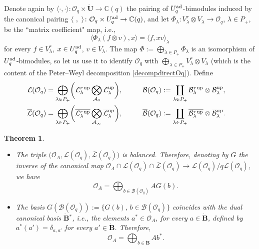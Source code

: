 \documentclass[pdftex]{sigma}
\numberwithin{equation}{section}
\newtheorem{teo}{Theorem}[section]
\theoremstyle{definition}
\newcommand{\Oq}{\Oo_{q}}
\newcommand{\mc}{\mathbb{C}}
\newcommand{\Ll}{{\mathcal L}}
\newcommand{\Oo}{{\mathcal O}}
\newcommand{\ra}{\rightarrow}
\begin{document}
Denote again by $\langle\cdot,\cdot \rangle \colon \Oq \times \dot{\mathbf{U}} \ra \mc(q)$ the pairing of $U_q^{\rm ad}$-bimodules induced by the canonical pairing $\langle\ ,\ \rangle \colon \Oq \times U_q^{\rm ad} \ra \mc(q)$, and let $\Phi_\lambda\colon V_\lambda^r \otimes V_\lambda \ra \Oo_q$, $\lambda\in P_+$, be the ``matrix coefficient" map, i.e.,
\begin{equation}\label{pairingOAKashi}
\langle \Phi_\lambda (f \otimes v),x\rangle = \langle f, xv\rangle_\lambda
\end{equation}
for every $f\in V_\lambda^r$, $x\in U_q^{\rm ad}$, $v\in V_\lambda$. The map $\Phi := \bigoplus_{\lambda\in P_+} \Phi_\lambda$ is an isomorphism of $U_q^{\rm ad}$-bimodules, so let us use it to identify $\Oo_q$ with $\bigoplus_{\lambda\in P_+} V_\lambda^r \otimes V_\lambda$ (which is the content of the Peter--Weyl decomposition \eqref{decompdirectOq}). Define
\begin{alignat*}{3}
& \Ll(\Oo_q) = \bigoplus_{\lambda\in P_+} \biggl(\Ll_{\lambda}^r {}^{\rm up} \bigotimes_{\mathcal{A}_0} \Ll_{\lambda}^{\rm up}\biggr),\qquad && \mathcal{B}(\Oo_q) := \coprod_{\lambda\in P_+} \mathcal{B}_\lambda^r {}^{\rm up} \otimes \mathcal{B}_\lambda^{\rm up},& \\
& \overline{\Ll}(\Oo_q) = \bigoplus_{\lambda\in P_+} \biggl(\overline{\Ll_{\lambda}^r {}^{\rm up}} \bigotimes_{\mathcal{A}_\infty} \overline{\Ll_{\lambda}^{\rm up}}\biggr),\qquad && \overline{\mathcal{B}}(\Oo_q) := \coprod_{\lambda\in P_+} \overline{\mathcal{B}_\lambda^r {}^{\rm up}} \otimes \overline{\mathcal{B}_\lambda^{\rm up}}.&
\end{alignat*}
\begin{teo}\label{canKashi} \quad
\begin{itemize}\itemsep=0pt
\item[$(i)$] The triple $\big(\Oo_A,\Ll(\Oo_q),\overline{\Ll}(\Oo_q)\big)$ is balanced. Therefore, denoting by $G$ the inverse of the canonical map $\Oo_A \cap \Ll(\Oo_q) \cap \overline{\Ll}(\Oo_q)\ra \Ll(\Oo_q)/q\Ll(\Oo_q)$, we have
\[\Oo_A = \bigoplus_{b\in \mathcal{B}(\Oo_q)} A G(b).\]
\item[$(ii)$] The basis $G(\mathcal{B}(\Oo_q)):=\{G(b), \, b\in \mathcal{B}(\Oo_q)\}$ coincides with the dual canonical basis $\dot{\mathbf{B}} {}^*$, i.e., the elements $a^* \in \Oo_A$, for every $a\in \dot{\mathbf{B}}$, defined by $a^* (a') = \delta_{a,a'}$ for every $a'\in \dot{\mathbf{B}}$. Therefore, \[\Oo_A = \bigoplus_{b\in \dot{\mathbf{B}}} Ab^*.\]
\end{itemize}
\end{teo}
\end{document}
